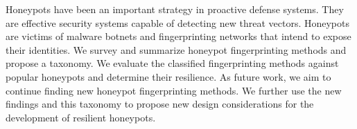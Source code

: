\documentclass[../main.tex]{subfiles}
\begin{document}
Honeypots have been an important strategy in proactive defense systems. They are effective security systems capable of detecting new threat vectors. Honeypots are victims of malware botnets and fingerprinting networks that intend to expose their identities.  We survey and summarize honeypot fingerprinting methods and propose a taxonomy. We evaluate the classified fingerprinting methods against popular honeypots and determine their resilience. As future work, we aim to continue finding new honeypot fingerprinting methods. We further use the new findings and this taxonomy to propose new design considerations for the development of resilient honeypots. 
\end{document}

